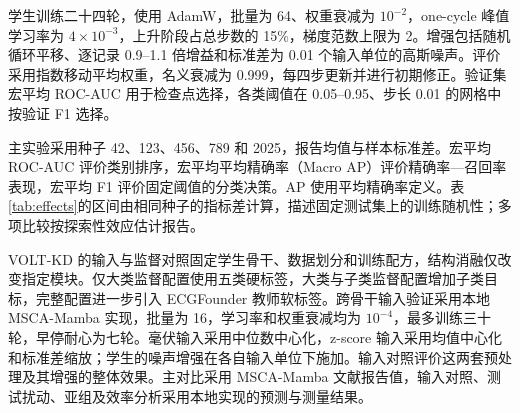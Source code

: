 \documentclass[11pt,a4paper,UTF8,fontset=windows]{ctexart}
\begin{document}
学生训练二十四轮，使用 AdamW\cite{loshchilov2019}，批量为 64、权重衰减为 $10^{-2}$，one-cycle 峰值学习率为 $4\times10^{-3}$，上升阶段占总步数的 15\%，梯度范数上限为 2。增强包括随机循环平移、逐记录 0.9--1.1 倍增益和标准差为 0.01 个输入单位的高斯噪声。评价采用指数移动平均权重，名义衰减为 0.999，每四步更新并进行初期修正。验证集宏平均 ROC-AUC 用于检查点选择，各类阈值在 0.05--0.95、步长 0.01 的网格中按验证 F1 选择。

主实验采用种子 42、123、456、789 和 2025，报告均值与样本标准差。宏平均 ROC-AUC 评价类别排序，宏平均平均精确率（Macro AP）评价精确率—召回率表现，宏平均 F1 评价固定阈值的分类决策。AP 使用平均精确率定义。表\ref{tab:effects}的区间由相同种子的指标差计算，描述固定测试集上的训练随机性；多项比较按探索性效应估计报告。

VOLT-KD 的输入与监督对照固定学生骨干、数据划分和训练配方，结构消融仅改变指定模块。仅大类监督配置使用五类硬标签，大类与子类监督配置增加子类目标，完整配置进一步引入 ECGFounder 教师软标签。跨骨干输入验证采用本地 MSCA-Mamba 实现，批量为 16，学习率和权重衰减均为 $10^{-4}$，最多训练三十轮，早停耐心为七轮。毫伏输入采用中位数中心化，z-score 输入采用均值中心化和标准差缩放；学生的噪声增强在各自输入单位下施加。输入对照评价这两套预处理及其增强的整体效果。主对比采用 MSCA-Mamba 文献报告值，输入对照、测试扰动、亚组及效率分析采用本地实现的预测与测量结果。
\end{document}
